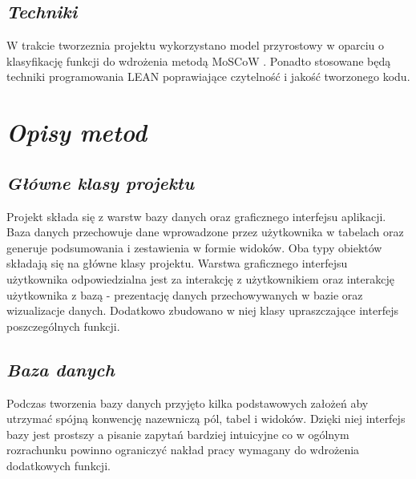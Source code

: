 \documentclass[a4paper,10pt, twoside]{report}
\newcommand{\customstylechapter}[1]{\large{\textit{#1}}}
\newcommand{\customstylesection}[1]{\textbf{\textit{#1}}}
\begin{document}
\section{\customstylesection{Techniki}}
{W trakcie tworzeznia projektu wykorzystano model przyrostowy 
\cite{Model Przyrostowy} w oparciu o klasyfikację funkcji do wdrożenia metodą 
MoSCoW \cite{MOSCOW}. Ponadto stosowane będą techniki programowania LEAN 
\cite{LEAN} poprawiające czytelność i jakość tworzonego kodu.}

\chapter{\customstylechapter{Opisy metod}} \label{Opisy metod}
\section{\customstylesection{Główne klasy projektu}}
{Projekt składa się z warstw bazy danych oraz graficznego interfejsu aplikacji. 
Baza danych przechowuje dane wprowadzone przez użytkownika w tabelach oraz 
generuje podsumowania i zestawienia w formie widoków. Oba typy obiektów składają
 się na główne klasy projektu. Warstwa graficznego interfejsu użytkownika 
odpowiedzialna jest za interakcję z użytkownikiem oraz interakcję użytkownika z 
bazą - prezentację danych przechowywanych w bazie oraz wizualizacje danych. 
Dodatkowo zbudowano w niej klasy upraszczające interfejs poszczególnych funkcji.}

\section{\customstylesection{Baza danych}}  \label{Baza danych}
{Podczas tworzenia bazy danych przyjęto kilka podstawowych założeń aby utrzymać 
spójną konwencję nazewniczą pól, tabel i widoków. Dzięki niej interfejs bazy 
jest prostszy a pisanie zapytań bardziej intuicyjne co w ogólnym rozrachunku 
powinno ograniczyć nakład pracy wymagany do wdrożenia dodatkowych funkcji.}
\end{document}
